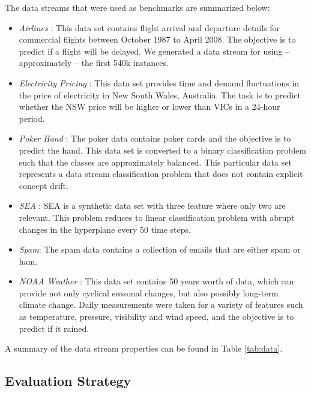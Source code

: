 \documentclass[10pt, conference]{IEEEtran}
\begin{document}
The data streams that were used as benchmarks are summarized below: 
\begin{itemize}
\item {\em Airlines} \cite{Ikonomovska2012Phd}: This data set contains flight arrival and departure details for commercial flights between October 1987 to April 2008. The objective is to predict if a flight will be delayed. We generated a data stream for using -- approximately -- the first 540k instances. 
\item {\em Electricity Pricing} \cite{Harries1999TR}: This data set provides time and demand fluctuations in the price of electricity in New South Wales, Australia.  The task is to predict whether the NSW price will be higher or lower than VICs in a 24-hour period.
\item {\em Poker Hand} \cite{Frank2010UCI}: The poker data contains poker cards and the objective is to predict the hand. This data set is converted to a binary classification problem such that the classes are approximately balanced. This particular data set represents a data stream classification problem that does not contain explicit concept drift. 
\item {\em SEA} \cite{Street2001KDD}: SEA is a synthetic data set with three feature where only two are relevant. This problem reduces to linear classification problem with abrupt changes in the hyperplane every 50 time steps. 
\item {\em Spam}: The spam data contains a collection of emails that are either spam or ham. 
\item {\em NOAA Weather} \cite{Elwell2011TNN}: This data set contains 50 years worth of data, which can provide not only cyclical seasonal changes, but also possibly long-term climate change. Daily measurements were taken for a variety of features such as temperature, pressure, visibility and wind speed, and the objective is to predict if it rained. 
\end{itemize}

A summary of the data stream properties can be found in Table \ref{tab:data}.






\subsection{Evaluation Strategy}
\end{document}

